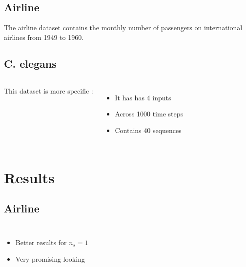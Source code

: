 \documentclass[14pt]{beamer}
\begin{document}
  \subsection{Airline}
  \begin{frame}{\insertsection}{\insertsubsection}
    The airline dataset contains the monthly number of passengers on international airlines from 1949 to 1960.
    
  \end{frame}

  \subsection{C. elegans}
  \begin{frame}{\insertsection}{\insertsubsection}
    \begin{columns}
      This dataset is more specific :
      \begin{itemize}
        \item It has has 4 inputs
        \item Across 1000 time steps
        \item Contains 40 sequences
      \end{itemize}
      
    \end{columns}
  \end{frame}

  \section{Results}
  \subsection{Airline}
  \begin{frame}{\insertsection}{\insertsubsection}
    \begin{columns}
      
      \begin{itemize}
        \item Better results for $n_s=1$
        \item Very promising looking
      \end{itemize}
    \end{columns}
  \end{frame}
\end{document}
